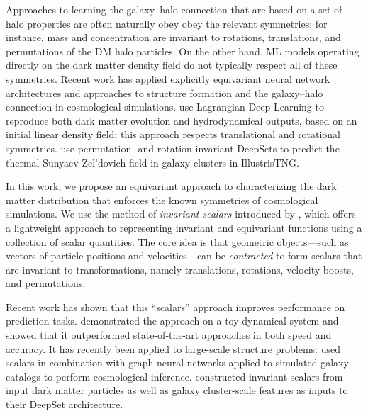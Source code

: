 Approaches to learning the galaxy--halo connection that are based on a set of halo properties are often naturally obey obey the relevant symmetries; for instance, mass and concentration are invariant to rotations, translations, and permutations of the DM halo particles.
On the other hand, ML models operating directly on the dark matter density field do not typically respect all of these symmetries.
Recent work has applied explicitly equivariant neural network architectures and approaches to structure formation and the galaxy--halo connection in cosmological simulations.
\cite{dai_learning_2020} use Lagrangian Deep Learning to reproduce both dark matter evolution and hydrodynamical outputs, based on an initial linear density field; this approach respects translational and rotational symmetries.
\cite{thiele_predicting_2022} use permutation- and rotation-invariant DeepSets to predict the thermal Sunyaev-Zel'dovich field in galaxy clusters in IllustrisTNG.

In this work, we propose an equivariant approach to characterizing the dark matter distribution that enforces the known symmetries of cosmological simulations. 
We use the method of \emph{invariant scalars} introduced by \cite{Villar2021a}, which offers a lightweight approach to representing invariant and equivariant functions using a collection of scalar quantities.
The core idea is that geometric objects---such as vectors of particle positions and velocities---can be \emph{contracted} to form scalars that are invariant to transformations, namely translations, rotations, velocity boosts, and permutations.

Recent work has shown that this ``scalars'' approach improves performance on prediction tasks.
\cite{yao_simple_2021} demonstrated the approach on a toy dynamical system and showed that it outperformed state-of-the-art approaches in both speed and accuracy.
It has recently been applied to large-scale structure problems: \cite{villanueva-domingo_learning_2022} used scalars in combination with graph neural networks applied to simulated galaxy catalogs to perform cosmological inference.
\cite{thiele_predicting_2022} constructed invariant scalars from input dark matter particles as well as galaxy cluster-scale features as inputs to their DeepSet architecture.

